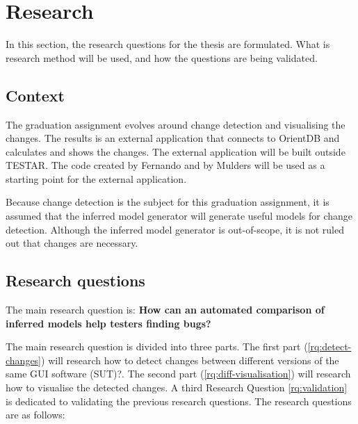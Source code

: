\section{Research} \label{questions}
In this section, the research questions for the thesis are formulated. What is research method will be used, and how the questions are being validated.

\subsection{Context}
The graduation assignment evolves around change detection and visualising the changes. The results is an external application that connects to OrientDB and calculates and shows the changes. The external application will be built outside TESTAR. The code created by Fernando and by Mulders will be used as a starting point for the external application. 

Because change detection is the subject for this graduation assignment, it is assumed that the inferred model generator will generate useful models for change detection. Although the inferred model generator is out-of-scope, it is not ruled out that changes are necessary.

\subsection{Research questions}
        
The main research question is: \textbf{How can an automated comparison of inferred models help testers finding bugs?}

The main research question is divided into three parts. The first part (\ref{rq:detect-changes}) will research how to detect changes between different versions of the same GUI software (SUT)?\cite{testar-todo}. The second part (\ref{rq:diff-visualisation}) will research how to visualise the detected changes. A third Research Question \ref{rq:validation} is dedicated to validating the previous research questions. The research questions are as follows: 

